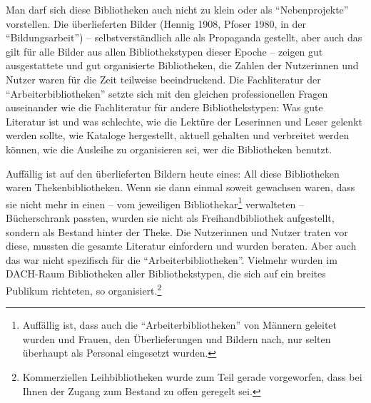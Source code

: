 \documentclass[a4paper,
fontsize=11pt,
oneside,
numbers=noperiodatend,
parskip=half-,
bibliography=totoc,
final
]{scrartcl}
\begin{document}
Man darf sich diese Bibliotheken auch nicht zu klein oder als
\enquote{Nebenprojekte} vorstellen. Die überlieferten Bilder (Hennig
1908, Pfoser 1980, in der \enquote{Bildungsarbeit}) --
selbstverständlich alle als Propaganda gestellt, aber auch das gilt für
alle Bilder aus allen Bibliothekstypen dieser Epoche -- zeigen gut
ausgestattete und gut organisierte Bibliotheken, die Zahlen der
Nutzerinnen und Nutzer waren für die Zeit teilweise beeindruckend. Die
Fachliteratur der \enquote{Arbeiterbibliotheken} setzte sich mit den
gleichen professionellen Fragen auseinander wie die Fachliteratur für
andere Bibliothekstypen: Was gute Literatur ist und was schlechte, wie
die Lektüre der Leserinnen und Leser gelenkt werden sollte, wie Kataloge
hergestellt, aktuell gehalten und verbreitet werden können, wie die
Ausleihe zu organisieren sei, wer die Bibliotheken benutzt.

Auffällig ist auf den überlieferten Bildern heute eines: All diese
Bibliotheken waren Thekenbibliotheken. Wenn sie dann einmal soweit
gewachsen waren, dass sie nicht mehr in einen -- vom jeweiligen
Bibliothekar\footnote{Auffällig ist, dass auch die
  \enquote{Arbeiterbibliotheken} von Männern geleitet wurden und Frauen,
  den Überlieferungen und Bildern nach, nur selten überhaupt als
  Personal eingesetzt wurden.} verwalteten -- Bücherschrank passten,
wurden sie nicht als Freihandbibliothek aufgestellt, sondern als Bestand
hinter der Theke. Die Nutzerinnen und Nutzer traten vor diese, mussten
die gesamte Literatur einfordern und wurden beraten. Aber auch das war
nicht spezifisch für die \enquote{Arbeiterbibliotheken}. Vielmehr wurden
im DACH-Raum Bibliotheken aller Bibliothekstypen, die sich auf ein
breites Publikum richteten, so organisiert.\footnote{Kommerziellen
  Leihbibliotheken wurde zum Teil gerade vorgeworfen, dass bei Ihnen der
  Zugang zum Bestand zu offen geregelt sei.}
\end{document}
